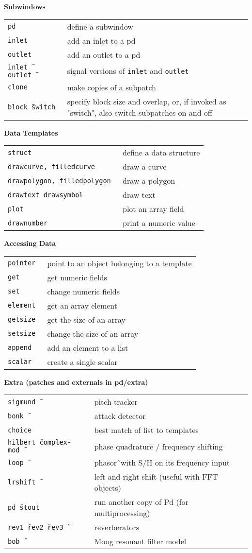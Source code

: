 \documentclass[a4paper, landscape, 10pt]{article}
\newcommand{\refcardtitle}[1]{
  \begin{center}
    \textbf{\small{#1}}
  \end{center}
}
\begin{document}
\begin{multicols}{3}
  \refcardtitle{Subwindows}
  \begin{tabularx}{9cm}{>{\tt}l X}
    pd & define a subwindow \\
    inlet & add an inlet to a pd \\
    outlet & add an outlet to a pd \\
    inlet\~\, outlet\~\ & signal versions of \texttt{inlet} and \texttt{outlet} \\
    clone & make copies of a subpatch \\
    block\~\ switch & specify block size and overlap, or, if invoked as "switch", also switch subpatches on and off \\
  \end{tabularx}

  \refcardtitle{Data Templates}
  \begin{tabularx}{9cm}{>{\tt}l X}
    struct & define a data structure \\
    drawcurve, filledcurve & draw a curve \\
    drawpolygon, filledpolygon & draw a polygon \\
    drawtext drawsymbol & draw text \\
    plot & plot an array field \\
    drawnumber & print a numeric value \\
    \end{tabularx}

  \refcardtitle{Accessing Data}
  \begin{tabularx}{9cm}{>{\tt}l X}
    pointer & point to an object belonging to a template \\
    get & get numeric fields \\
    set & change numeric fields \\
    element & get an array element \\
    getsize & get the size of an array \\
    setsize & change the size of an array \\
    append & add an element to a list \\
    scalar & create a single scalar \\
  \end{tabularx}
  
  \refcardtitle{Extra (patches and externals in pd/extra)}
  \begin{tabularx}{9cm}{>{\tt}l X}
  	sigmund\~\ & pitch tracker \\
  	bonk\~\ & attack detector \\
  	choice & best match of list to templates \\
  	hilbert\~\ complex-mod\~\ & phase quadrature / frequency shifting \\
  	loop\~\ & phasor\~\ with S/H on its frequency input\\
  	lrshift\~\ & left and right shift (useful with FFT objects) \\
  	pd\~\ stout & run another copy of Pd (for multiprocessing) \\ 
  	rev1\~\ rev2\~\ rev3\~\ & reverberators \\
  	bob\~\ & Moog resonant filter model \\
  	

\end{tabularx}
\end{multicols}
\end{document}
